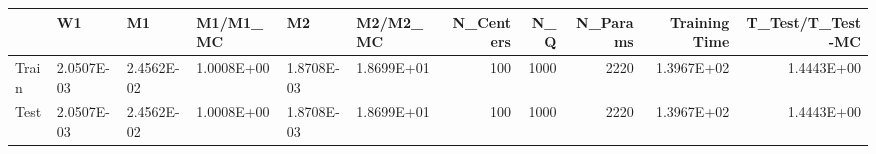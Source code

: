 \begin{tabular}{llllllrrrrr}
\toprule
{} &         W1 &         M1 &   M1/M1\_MC &         M2 &   M2/M2\_MC &  N\_Centers &   N\_Q &  N\_Params &  Training Time &  T\_Test/T\_Test-MC \\
\midrule
Train & 2.0507E-03 & 2.4562E-02 & 1.0008E+00 & 1.8708E-03 & 1.8699E+01 &        100 &  1000 &      2220 &     1.3967E+02 &        1.4443E+00 \\
Test  & 2.0507E-03 & 2.4562E-02 & 1.0008E+00 & 1.8708E-03 & 1.8699E+01 &        100 &  1000 &      2220 &     1.3967E+02 &        1.4443E+00 \\
\bottomrule
\end{tabular}
